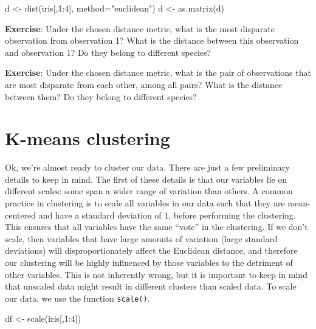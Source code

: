 \documentclass[
]{book}
\newenvironment{Shaded}{\begin{snugshade}}{\end{snugshade}}
\newcommand{\AttributeTok}[1]{\textcolor[rgb]{0.77,0.63,0.00}{#1}}
\newcommand{\DecValTok}[1]{\textcolor[rgb]{0.00,0.00,0.81}{#1}}
\newcommand{\FunctionTok}[1]{\textcolor[rgb]{0.00,0.00,0.00}{#1}}
\newcommand{\NormalTok}[1]{#1}
\newcommand{\OtherTok}[1]{\textcolor[rgb]{0.56,0.35,0.01}{#1}}
\newcommand{\SpecialCharTok}[1]{\textcolor[rgb]{0.00,0.00,0.00}{#1}}
\newcommand{\StringTok}[1]{\textcolor[rgb]{0.31,0.60,0.02}{#1}}
\begin{document}
\begin{Shaded}
\begin{Highlighting}[]
\NormalTok{d }\OtherTok{\textless{}{-}} \FunctionTok{dist}\NormalTok{(iris[,}\DecValTok{1}\SpecialCharTok{:}\DecValTok{4}\NormalTok{], }\AttributeTok{method=}\StringTok{"euclidean"}\NormalTok{)}
\NormalTok{d }\OtherTok{\textless{}{-}} \FunctionTok{as.matrix}\NormalTok{(d)}
\end{Highlighting}
\end{Shaded}

\textbf{Exercise}: Under the chosen distance metric, what is the most disparate observation from observation 1? What is the distance between this observation and observation 1? Do they belong to different species?

\textbf{Exercise}: Under the chosen distance metric, what is the pair of observations that are most disparate from each other, among all pairs? What is the distance between them? Do they belong to different species?

\hypertarget{k-means-clustering}{%
\section{K-means clustering}\label{k-means-clustering}}

Ok, we're almost ready to cluster our data. There are just a few preliminary details to keep in mind.
The first of these details is that our variables lie on different scales: some span a wider range of variation than others. A common practice in clustering is to scale all variables in our data such that they are mean-centered and have a standard deviation of 1, before performing the clustering. This ensures that all variables have the same ``vote'' in the clustering. If we don't scale, then variables that have large amounts of variation (large standard deviations) will disproportionately affect the Euclidean distance, and therefore our clustering will be highly influenced by those variables to the detriment of other variables. This is not inherently wrong, but it is important to keep in mind that unscaled data might result in different clusters than scaled data. To scale our data, we use the function \texttt{scale()}.

\begin{Shaded}
\begin{Highlighting}[]
\NormalTok{df }\OtherTok{\textless{}{-}} \FunctionTok{scale}\NormalTok{(iris[,}\DecValTok{1}\SpecialCharTok{:}\DecValTok{4}\NormalTok{])}
\end{Highlighting}
\end{Shaded}
\end{document}
